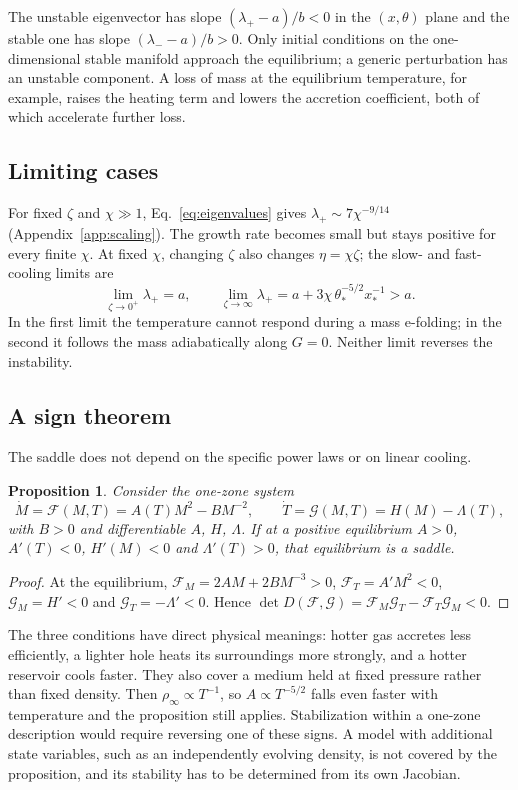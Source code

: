 \documentclass[11pt,a4paper]{article}
\newtheorem{proposition}{Proposition}
\begin{document}
The unstable eigenvector has slope $(\lambda_+-a)/b<0$ in the $(x,\theta)$ plane and the stable one has slope $(\lambda_--a)/b>0$. Only initial conditions on the one-dimensional stable manifold approach the equilibrium; a generic perturbation has an unstable component. A loss of mass at the equilibrium temperature, for example, raises the heating term and lowers the accretion coefficient, both of which accelerate further loss.

\subsection{Limiting cases}
For fixed $\zeta$ and $\chi\gg1$, Eq.~\eqref{eq:eigenvalues} gives $\lambda_+\sim7\chi^{-9/14}$ (Appendix~\ref{app:scaling}). The growth rate becomes small but stays positive for every finite $\chi$. At fixed $\chi$, changing $\zeta$ also changes $\eta=\chi\zeta$; the slow- and fast-cooling limits are
\begin{equation*}
 \lim_{\zeta\to0^+}\lambda_+=a,\qquad
 \lim_{\zeta\to\infty}\lambda_+=a+3\chi\,\theta_*^{-5/2}x_*^{-1}>a.
\end{equation*}
In the first limit the temperature cannot respond during a mass e-folding; in the second it follows the mass adiabatically along $G=0$. Neither limit reverses the instability.

\subsection{A sign theorem}
The saddle does not depend on the specific power laws or on linear cooling.

\begin{proposition}\label{prop:sign}
Consider the one-zone system
\begin{equation*}
 \dot M=\mathcal F(M,T)=A(T)M^2-BM^{-2},\qquad
 \dot T=\mathcal G(M,T)=H(M)-\Lambda(T),
\end{equation*}
with $B>0$ and differentiable $A$, $H$, $\Lambda$. If at a positive equilibrium $A>0$, $A'(T)<0$, $H'(M)<0$ and $\Lambda'(T)>0$, that equilibrium is a saddle.
\end{proposition}
\begin{proof}
At the equilibrium, $\mathcal F_M=2AM+2BM^{-3}>0$, $\mathcal F_T=A'M^2<0$, $\mathcal G_M=H'<0$ and $\mathcal G_T=-\Lambda'<0$. Hence $\det D(\mathcal F,\mathcal G)=\mathcal F_M\mathcal G_T-\mathcal F_T\mathcal G_M<0$.
\end{proof}

The three conditions have direct physical meanings: hotter gas accretes less efficiently, a lighter hole heats its surroundings more strongly, and a hotter reservoir cools faster. They also cover a medium held at fixed pressure rather than fixed density. Then $\rho_\infty\propto T^{-1}$, so $A\propto T^{-5/2}$ falls even faster with temperature and the proposition still applies. Stabilization within a one-zone description would require reversing one of these signs. A model with additional state variables, such as an independently evolving density, is not covered by the proposition, and its stability has to be determined from its own Jacobian.
\end{document}
